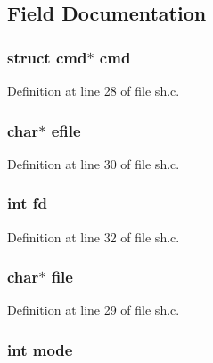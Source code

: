 \subsection{Field Documentation}
\hypertarget{structredircmd_ae827072868c061a3985f9032a4522673}{
\subsubsection[{cmd}]{\setlength{\rightskip}{0pt plus 5cm}struct {\bf cmd}$\ast$ {\bf cmd}}}\label{structredircmd_ae827072868c061a3985f9032a4522673}


Definition at line 28 of file sh.\-c.

\hypertarget{structredircmd_ab5755209db30db6cbfdec21ca15015db}{
\subsubsection[{efile}]{\setlength{\rightskip}{0pt plus 5cm}char$\ast$ efile}}\label{structredircmd_ab5755209db30db6cbfdec21ca15015db}


Definition at line 30 of file sh.\-c.

\hypertarget{structredircmd_a6f8059414f0228f0256115e024eeed4b}{
\subsubsection[{fd}]{\setlength{\rightskip}{0pt plus 5cm}int fd}}\label{structredircmd_a6f8059414f0228f0256115e024eeed4b}


Definition at line 32 of file sh.\-c.

\hypertarget{structredircmd_adf16cd437526a5c5e0e0af87745acbb8}{
\subsubsection[{file}]{\setlength{\rightskip}{0pt plus 5cm}char$\ast$ {\bf file}}}\label{structredircmd_adf16cd437526a5c5e0e0af87745acbb8}


Definition at line 29 of file sh.\-c.

\hypertarget{structredircmd_a1ea5d0cb93f22f7d0fdf804bd68c3326}{
\subsubsection[{mode}]{\setlength{\rightskip}{0pt plus 5cm}int mode}}\label{structredircmd_a1ea5d0cb93f22f7d0fdf804bd68c3326}


